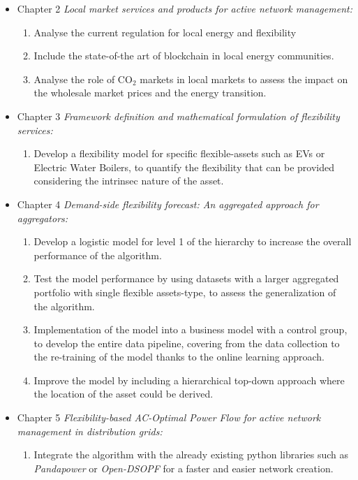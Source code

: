 \begin{itemize}
\item Chapter 2 \textit{Local market services and products for active network management:} 
	\begin{enumerate}
		\item Analyse the current regulation for local energy and flexibility 
		\item Include the state-of-the art of blockchain in local energy communities. 
		\item Analyse the role of CO$_2$ markets in local markets to assess the impact on the wholesale market prices and the energy transition. 
	\end{enumerate}
\item Chapter 3 \textit{Framework definition and mathematical formulation of flexibility services:} 
	\begin{enumerate}
		\item Develop a flexibility model for specific flexible-assets such as EVs or Electric Water Boilers, to quantify the flexibility that can be provided considering the intrinsec nature of the asset. 
	\end{enumerate}
\item Chapter 4 \textit{Demand-side flexibility forecast: An aggregated approach for aggregators:} 
	\begin{enumerate}
		\item Develop a logistic model for level 1 of the hierarchy to increase the overall performance of the algorithm. 
		\item Test the model performance by using datasets with a larger aggregated portfolio with single flexible assets-type, to assess the generalization of the algorithm.
		\item Implementation of the model into a business model with a control group, to develop the entire data pipeline, covering from the data collection to the re-training of the model thanks to the online learning approach.  
		\item Improve the model by including a hierarchical top-down approach where the location of the asset could be derived. 
	\end{enumerate}
\item Chapter 5 \textit{Flexibility-based AC-Optimal Power Flow for active network management in distribution grids:} 
	\begin{enumerate}
		\item Integrate the algorithm with the already existing python libraries such as \textit{Pandapower} or \textit{Open-DSOPF} for a faster and easier network creation. 

\end{enumerate}
\end{itemize}
